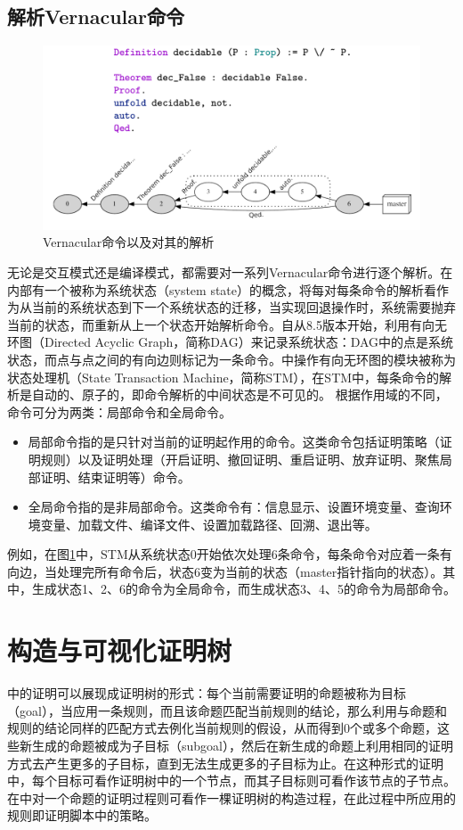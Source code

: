 \subsection{解析Vernacular命令}
\begin{figure}[h!]
	\centering
	\includegraphics[width=12cm]{Img/coq_stm.png}
	\caption{Vernacular命令以及对其的解析}
	\label{coq:stm}
\end{figure}

无论是交互模式还是编译模式，都需要对一系列Vernacular命令进行逐个解析。在内部有一个被称为系统状态（system state）的概念，将每对每条命令的解析看作为从当前的系统状态到下一个系统状态的迁移，当实现回退操作时，系统需要抛弃当前的状态，而重新从上一个状态开始解析命令。自从8.5版本开始，利用有向无环图（Directed Acyclic Graph，简称DAG）来记录系统状态：DAG中的点是系统状态，而点与点之间的有向边则标记为一条命令。中操作有向无环图的模块被称为状态处理机（State Transaction Machine，简称STM），在STM中，每条命令的解析是自动的、原子的，即命令解析的中间状态是不可见的。
根据作用域的不同，命令可分为两类：局部命令和全局命令。
\begin{itemize}
	\item 局部命令指的是只针对当前的证明起作用的命令。这类命令包括证明策略（证明规则）以及证明处理（开启证明、撤回证明、重启证明、放弃证明、聚焦局部证明、结束证明等）命令。
	\item 全局命令指的是非局部命令。这类命令有：信息显示、设置环境变量、查询环境变量、加载文件、编译文件、设置加载路径、回溯、退出等。
\end{itemize}
例如，在图\ref{coq:stm}中，STM从系统状态0开始依次处理6条命令，每条命令对应着一条有向边，当处理完所有命令后，状态6变为当前的状态（master指针指向的状态）。其中，生成状态1、2、6的命令为全局命令，而生成状态3、4、5的命令为局部命令。




\section{构造与可视化证明树}
中的证明可以展现成证明树的形式：每个当前需要证明的命题被称为目标（goal），当应用一条规则，而且该命题匹配当前规则的结论，那么利用与命题和规则的结论同样的匹配方式去例化当前规则的假设，从而得到0个或多个命题，这些新生成的命题被成为子目标（subgoal），然后在新生成的命题上利用相同的证明方式去产生更多的子目标，直到无法生成更多的子目标为止。在这种形式的证明中，每个目标可看作证明树中的一个节点，而其子目标则可看作该节点的子节点。在中对一个命题的证明过程则可看作一棵证明树的构造过程，在此过程中所应用的规则即证明脚本中的策略。

